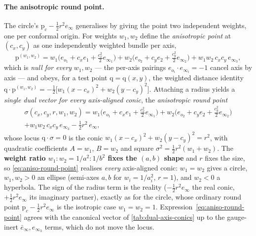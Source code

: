 \documentclass{birkjour}
\theoremstyle{definition}
\theoremstyle{remark}
\newcommand{\einf}{e_\infty}
\newcommand{\einfbar}{\bar e_\infty}
\begin{document}
\paragraph{The anisotropic round point.}
The circle's $\mathrm{p}_c-\tfrac12 r^2\einf$ generalises by giving the point two
independent weights, one per conformal origin. For weights $w_1,w_2$ define the \emph{anisotropic point} at $(c_x,c_y)$ as one
independently weighted bundle per axis,
\begin{equation}\label{eq:aniso-point}
  \mathrm{p}^{(w_1,w_2)} =
     w_1\big(e_{o_1}+c_x e_1+\tfrac{c_x^2}{2}e_{\infty_1}\big)
   + w_2\big(e_{o_2}+c_y e_2+\tfrac{c_y^2}{2}e_{\infty_2}\big)
   + w_1 w_2\, c_x c_y\,e_{\infty_3},
\end{equation}
which is \emph{null for every} $w_1,w_2$ --- the per-axis pairings
$e_{o_i}\!\cdot e_{\infty_i}=-1$ cancel axis by axis --- and obeys, for a test
point $\mathrm{q}=\mathrm{q}(x,y)$, the weighted distance identity
$\mathrm{q}\cdot\mathrm{p}^{(w_1,w_2)} = -\tfrac12\big[w_1(x-c_x)^2 + w_2(y-c_y)^2\big]$.
Attaching a radius yields a \emph{single dual vector for every axis-aligned conic},
the \emph{anisotropic round point}
\begin{multline}\label{eq:aniso-round-point}
  \sigma(c_x,c_y,r,w_1,w_2) =
     w_1\big(e_{o_1}+c_x e_1+\tfrac{c_x^2}{2}e_{\infty_1}\big)
   + w_2\big(e_{o_2}+c_y e_2+\tfrac{c_y^2}{2}e_{\infty_2}\big)\\
   + w_1 w_2\, c_x c_y\,e_{\infty_3}
   - \tfrac12 r^2\,\einf,
\end{multline}
whose locus $\mathrm{q}\cdot\sigma=0$ is the conic
$w_1(x-c_x)^2 + w_2(y-c_y)^2 = r^2$, with quadratic coefficients $A=w_1$, $B=w_2$
and square $\sigma^2 = \tfrac12 r^2(w_1+w_2)$. The \textbf{weight ratio
$w_1:w_2 = 1/a^2 : 1/b^2$ fixes the $(a,b)$ shape} and $r$ fixes the size, so
\eqref{eq:aniso-round-point} realises \emph{every} axis-aligned conic: $w_1=w_2$
gives a circle, $w_1,w_2>0$ an ellipse (semi-axes $a,b$ for $w_i=1/a_i^2$, $r=1$),
and $w_2<0$ a hyperbola. The sign of the radius term is the reality
($-\tfrac12 r^2\einf$ the real conic, $+\tfrac12 r^2\einf$ its imaginary partner),
exactly as for the circle, whose ordinary round point $\mathrm{p}_c-\tfrac12 r^2\einf$
is the isotropic case $w_1=w_2=1$. Expression~\eqref{eq:aniso-round-point} agrees
with the canonical vector of \cref{tab:dual-axis-conics} up to the gauge-inert
$\einfbar,e_{\infty_3}$ terms, which do not move the locus.
\end{document}
